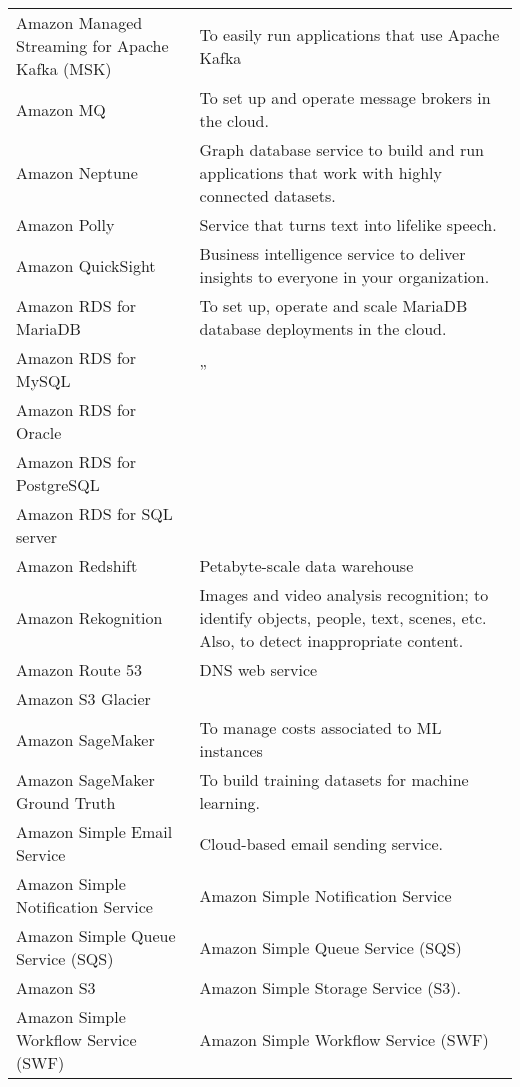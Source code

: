 \documentclass[]{book}
\begin{document}
\begin{table}
\begin{tabular}[t]{ll}
Amazon Managed Streaming for Apache Kafka (MSK) & To easily run applications that use Apache Kafka\\
Amazon MQ & To set up and operate message brokers in the cloud.\\
\addlinespace
Amazon Neptune & Graph database service to build and run applications that work with highly connected datasets.\\
Amazon Polly & Service that turns text into lifelike speech.\\
Amazon QuickSight & Business intelligence service to deliver insights to everyone in your organization.\\
Amazon RDS for MariaDB & To set up, operate and scale MariaDB database deployments in the cloud.\\
Amazon RDS for MySQL & ''\\
\addlinespace
Amazon RDS for Oracle & \\
Amazon RDS for PostgreSQL & \\
Amazon RDS for SQL server & \\
Amazon Redshift & Petabyte-scale data warehouse\\
Amazon Rekognition & Images and video analysis recognition; to identify objects, people, text, scenes, etc. Also, to detect inappropriate content.\\
\addlinespace
Amazon Route 53 & DNS web service\\
Amazon S3 Glacier & \\
Amazon SageMaker & To manage costs associated to ML instances\\
Amazon SageMaker Ground Truth & To build training datasets for machine learning.\\
Amazon Simple Email Service & Cloud-based email sending service.\\
\addlinespace
Amazon Simple Notification Service & Amazon Simple Notification Service\\
Amazon Simple Queue Service (SQS) & Amazon Simple Queue Service (SQS)\\
Amazon S3 & Amazon Simple Storage Service (S3).\\
Amazon Simple Workflow Service (SWF) & Amazon Simple Workflow Service (SWF)\\
\bottomrule
\end{tabular}
\end{table}


\end{document}
